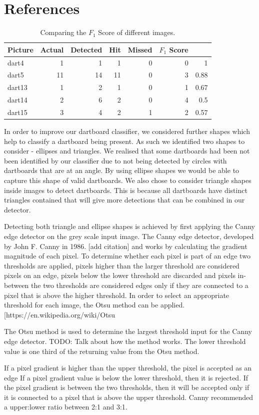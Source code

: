 \documentclass[a4paper]{article}
\begin{document}
\section{References}


\begin{table} [H]
\centering
\begin{tabular}{l| r | r | r | r | r | r}
Picture & Actual & Detected & Hit & Missed & \(F_{1}\) Score \\\hline
dart4 & 1 & 1 & 1 & 0 & 0 & 1\\
dart5 & 11 & 14 & 11 & 0 & 3 & 0.88 \\
dart13 & 1 & 2 & 1 & 0 & 1 & 0.67 \\
dart14 & 2 & 6 & 2 & 0 & 4 & 0.5 \\
dart15 & 3 & 4 & 2 & 1 & 2 & 0.57
\end{tabular}
\caption{\label{tab:F1}Comparing the \(F_{1}\) Score of different images.}
\end{table}

In order to improve our dartboard classifier, we considered further shapes which help to classify a dartboard being present.
As such we identified two shapes to consider - ellipses and triangles.
We realised that some dartboards had been not been identified by our classifier due to not being detected by circles with dartboards that are at an angle.
By using ellipse shapes we would be able to capture this shape of valid dartboards.
We also chose to consider triangle shapes inside images to detect dartboards.
This is because all dartboards have distinct triangles contained that will give more detections that can be combined in our detector.

Detecting both triangle and ellipse shapes is achieved by first applying the Canny edge detector on the grey scale input image.
The Canny edge detector, developed by  John F. Canny in 1986. [add citation] and works by calculating the gradient magnitude of each pixel. To determine whether each pixel is part of an edge two thresholds are applied, pixels higher than the larger threshold are considered pixels on an edge, pixels below the lower threshold are discarded and pixels in-between the two thresholds are considered edges only if they are connected to a pixel that is above the higher threshold.
In order to select an appropriate threshold for each image, the Otsu method can be applied. [https://en.wikipedia.org/wiki/Otsu%

The Otsu method is used to determine the largest threshold input for the Canny edge detector.
TODO: Talk about how the method works.
The lower threshold value is one third of the returning value from the Otsu method.



If a pixel gradient is higher than the upper threshold, the pixel is accepted as an edge
If a pixel gradient value is below the lower threshold, then it is rejected.
If the pixel gradient is between the two thresholds, then it will be accepted only if it is connected to a pixel that is above the upper threshold.
Canny recommended a upper:lower ratio between 2:1 and 3:1.
\end{document}
